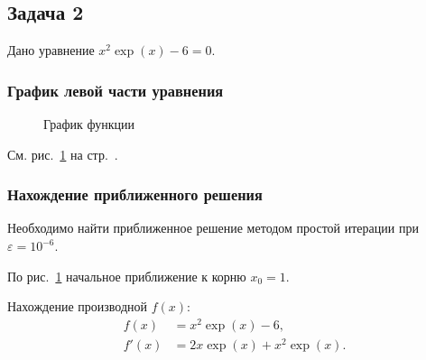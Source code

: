 \documentclass[10pt, a4paper, titlepage]{article}
\begin{document}
\subsection{Задача 2}

Дано уравнение $x^2\exp(x)-6=0$.

\subsubsection*{График левой части уравнения}
\begin{figure}[!ht]
    \centering
    \caption{График функции}
    \label{sr1Task2Function}
\end{figure}

См. рис.~\ref{sr1Task2Function} на стр.~\pageref{sr1Task2Function}.

\subsubsection*{Нахождение приближенного решения}

Необходимо найти приближенное решение методом простой итерации при $\varepsilon=10^{-6}$.

По рис.~\ref{sr1Task2Function} начальное приближение к корню $x_0=1$.

Нахождение производной $f(x)$:
\begin{align*}
f(x) &= x^2\exp(x)-6, \\ 
f'(x) &= 2x\exp(x)+x^2\exp(x).
\end{align*}
\end{document}
